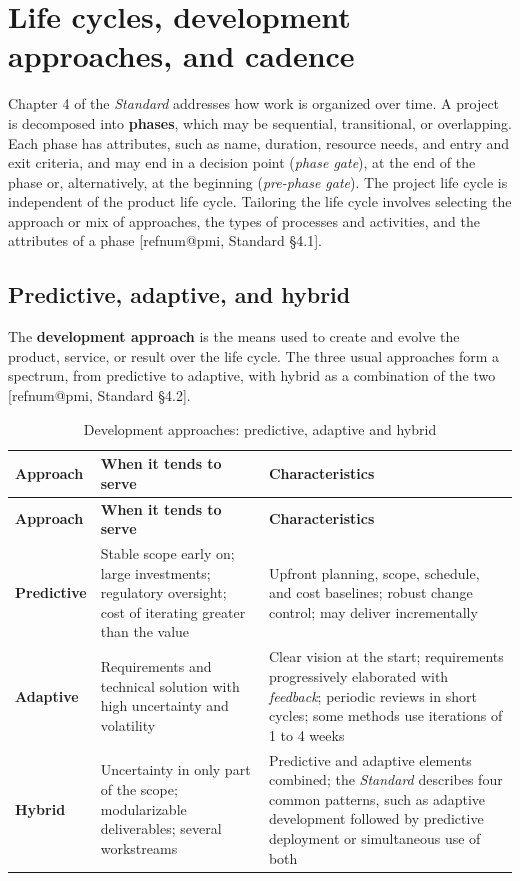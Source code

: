 \documentclass[11pt,a4paper]{article}
\makeatletter
\newcommand{\refnum}[1]{\csname refnum@#1\endcsname}
\newcommand{\cit}[1]{[\refnum{#1}]}
\newcommand{\SingleSpacing}{}
\newcommand{\fontetab}[1]{\par\vspace{3pt}{\small\noindent Source: #1\par}}
\makeatother
\begin{document}
\section{Life cycles, development approaches, and cadence}

Chapter 4 of the \textit{Standard} addresses how work is organized over time. A project is decomposed into \textbf{phases}, which may be sequential, transitional, or overlapping. Each phase has attributes, such as name, duration, resource needs, and entry and exit criteria, and may end in a decision point (\textit{phase gate}), at the end of the phase or, alternatively, at the beginning (\textit{pre-phase gate}). The project life cycle is independent of the product life cycle. Tailoring the life cycle involves selecting the approach or mix of approaches, the types of processes and activities, and the attributes of a phase [\refnum{pmi}, Standard §4.1].
\subsection{Predictive, adaptive, and hybrid}

The \textbf{development approach} is the means used to create and evolve the product, service, or result over the life cycle. The three usual approaches form a spectrum, from predictive to adaptive, with hybrid as a combination of the two [\refnum{pmi}, Standard §4.2].

\begingroup\SingleSpacing\small
\begin{longtable}{@{}>{\raggedright\arraybackslash}p{}>{\raggedright\arraybackslash}p{}>{\raggedright\arraybackslash}p{}@{}}
\caption{Development approaches: predictive, adaptive and hybrid}\label{tab:t4}\\
\toprule
\textbf{Approach} & \textbf{When it tends to serve} & \textbf{Characteristics}\\
\midrule
\endfirsthead
\toprule
\textbf{Approach} & \textbf{When it tends to serve} & \textbf{Characteristics}\\
\midrule
\endhead
\bottomrule
\endfoot
\bottomrule
\endlastfoot
\textbf{Predictive} & Stable scope early on; large investments; regulatory oversight; cost of iterating greater than the value & Upfront planning, scope, schedule, and cost baselines; robust change control; may deliver incrementally\\[3pt]
\textbf{Adaptive} & Requirements and technical solution with high uncertainty and volatility & Clear vision at the start; requirements progressively elaborated with \textit{feedback}; periodic reviews in short cycles; some methods use iterations of 1 to 4 weeks\\[3pt]
\textbf{Hybrid} & Uncertainty in only part of the scope; modularizable deliverables; several workstreams & Predictive and adaptive elements combined; the \textit{Standard} describes four common patterns, such as adaptive development followed by predictive deployment or simultaneous use of both\\[3pt]
\end{longtable}
\endgroup
\fontetab{Prepared by the authors (2026), based on \cit{pmi}.}
\end{document}
